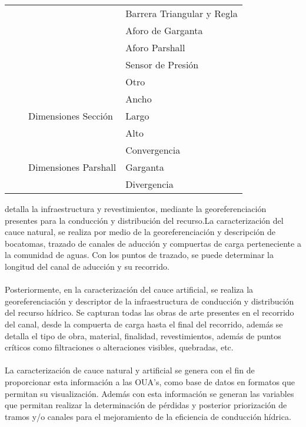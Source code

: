 \documentclass[]{article}
\begin{document}
\begin{longtable}[H]{|p{3cm}|p{3.5cm}|p{3.5cm}|p{3.5cm}|}
    \cline{4-4}
    & & & Barrera Triangular y Regla\\
    \cline{4-4}
    & & & Aforo de Garganta\\
    \cline{4-4}
    & & & Aforo Parshall\\
    \cline{4-4}
    & & & Sensor de Presión\\
    \cline{4-4}
    & & & Otro\\
    \cline{3-4}
    & & \multirow {3}{3.5cm}{Dimensiones Sección} & Ancho\\
    \cline{4-4}
    & & & Largo\\
    \cline{4-4}
    & & & Alto\\
    \cline{3-4}
    & & \multirow {3}{3.5cm}{Dimensiones Parshall} & Convergencia\\
    \cline{4-4}
    & & & Garganta\\
    \cline{4-4}
    & & & Divergencia\\    
    \hline
\end{longtable}




detalla la infraestructura y revestimientos, mediante la georeferenciación  presentes para la conducción y distribución del recurso.La caracterización del cauce natural, se realiza por medio de la georeferenciación y descripción de bocatomas, trazado de canales de aducción y compuertas de carga perteneciente a la comunidad de aguas. Con los puntos de trazado, se puede determinar la longitud del canal de aducción y su recorrido.\\
\\
Posteriormente, en la caracterización del cauce artificial, se realiza la georeferenciación y descriptor de la infraestructura de conducción y distribución del recurso hídrico. Se capturan todas las obras de arte presentes en el recorrido del canal, desde la compuerta de carga hasta el final del recorrido, además se detalla el tipo de obra, material, finalidad, revestimientos, además de puntos críticos como filtraciones o alteraciones visibles, quebradas, etc.\\
\\
La caracterización de cauce natural y artificial se genera con el fin de proporcionar esta información a las OUA’s, como base de datos en formatos que permitan su visualización. Además con esta información se generan las variables que permitan realizar la determinación de pérdidas y posterior priorización de tramos y/o canales para el mejoramiento de la eficiencia de conducción hídrica.\\
\end{document}
